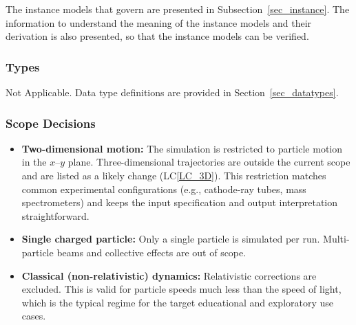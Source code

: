 \documentclass[12pt]{article}
\newcommand{\lcref}[1]{LC\ref{#1}}
\begin{document}


The instance models that govern \progname{} are presented in
Subsection~\ref{sec_instance}.  The information to understand the meaning of the
instance models and their derivation is also presented, so that the instance
models can be verified.

\subsubsection{Types}

Not Applicable. Data type definitions are provided in Section~\ref{sec_datatypes}.

\subsubsection{Scope Decisions}

\begin{itemize}
\item \textbf{Two-dimensional motion:} The simulation is restricted to particle motion in the
  $x$--$y$ plane. Three-dimensional trajectories are outside the current scope and are listed
  as a likely change (\lcref{LC_3D}). This restriction matches common
  experimental configurations (e.g., cathode-ray tubes, mass spectrometers) and keeps the
  input specification and output interpretation straightforward.

\item \textbf{Single charged particle:} Only a single particle is simulated per run. Multi-particle
  beams and collective effects are out of scope.

\item \textbf{Classical (non-relativistic) dynamics:} Relativistic corrections are excluded.
  This is valid for particle speeds much less than the speed of light, which is the typical
  regime for the target educational and exploratory use cases.
\end{itemize}
\end{document}
